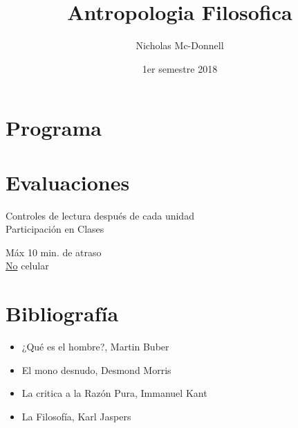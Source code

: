 

\title{Antropologia Filosofica}
\author{Nicholas Mc-Donnell}
\date{1er semestre 2018}



    \maketitle

    \section*{Programa}

    \section*{Evaluaciones}
    { Controles de lectura después de cada unidad}\\
    Participación en Clases

    \begin{obs}
        Máx 10 min. de atraso\\
        \underline{No} celular
    \end{obs}

    \section*{Bibliografía}
    \begin{itemize}
        \item ¿Qué es el hombre?, Martin Buber

        \item El mono desnudo, Desmond Morris

        \item La critica a la Razón Pura, Immanuel Kant

        \item La Filosofía, Karl Jaspers
    \end{itemize}
    \newpage

    \tableofcontents

